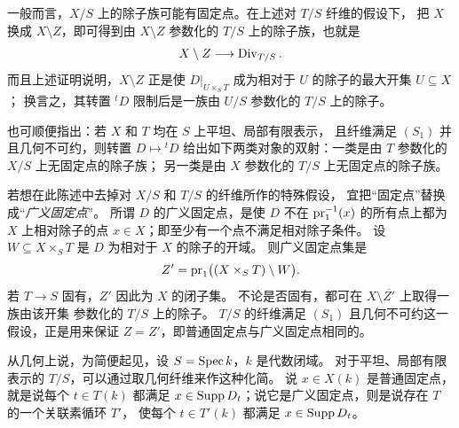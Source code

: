一般而言，\(X/S\) 上的除子族可能有固定点。在上述对 \(T/S\) 纤维的假设下，
把 \(X\) 换成 \(X\setminus Z\)，即可得到由 \(X\setminus Z\) 参数化的
\(T/S\) 上的除子族，也就是
\[
 X\setminus Z\longrightarrow\operatorname{Div}_{T/S}.
\]
而且上述证明说明，\(X\setminus Z\) 正是使 \(D|_{U\times_S T}\)
成为相对于 \(U\) 的除子的最大开集 \(U\subseteq X\)；
换言之，其转置 \({}^{t}D\) 限制后是一族由 \(U/S\) 参数化的 \(T/S\) 上的除子。

\medskip
也可顺便指出：若 \(X\) 和 \(T\) 均在 \(S\) 上平坦、局部有限表示，
且纤维满足 \((S_1)\) 并且几何不可约，则转置 \(D\mapsto{}^{t}D\)
给出如下两类对象的双射：一类是由 \(T\) 参数化的 \(X/S\) 上无固定点的除子族；
另一类是由 \(X\) 参数化的 \(T/S\) 上无固定点的除子族。

若想在此陈述中去掉对 \(X/S\) 和 \(T/S\) 的纤维所作的特殊假设，
宜把“固定点”替换成“\emph{广义固定点}”。
所谓 \(D\) 的广义固定点，是使 \(D\) 不在 \(\operatorname{pr}_1^{-1}(x)\)
的所有点上都为 \(X\) 上相对除子的点 \(x\in X\)；即至少有一个点不满足相对除子条件。
设 \(W\subseteq X\times_S T\) 是 \(D\) 为相对于 \(X\) 的除子的开域。
则广义固定点集是
\[
 Z'=\operatorname{pr}_1\bigl((X\times_S T)\setminus W\bigr).
\]
若 \(T\to S\) 固有，\(Z'\) 因此为 \(X\) 的闭子集。
不论是否固有，都可在 \(X\setminus\overline{Z'}\) 上取得一族由该开集
参数化的 \(T/S\) 上的除子。
\(T/S\) 的纤维满足 \((S_1)\) 且几何不可约这一假设，正是用来保证
\(Z=Z'\)，即普通固定点与广义固定点相同的。


从几何上说，为简便起见，设 \(S=\operatorname{Spec} k\)，\(k\) 是代数闭域。
对于平坦、局部有限表示的 \(T/S\)，可以通过取几何纤维来作这种化简。
说 \(x\in X(k)\) 是普通固定点，就是说每个 \(t\in T(k)\) 都满足
\(x\in\operatorname{Supp} D_t\)；说它是广义固定点，则是说存在 \(T\) 的一个关联素循环 \(T'\)，
使每个 \(t\in T'(k)\) 都满足 \(x\in\operatorname{Supp} D_t\)。

